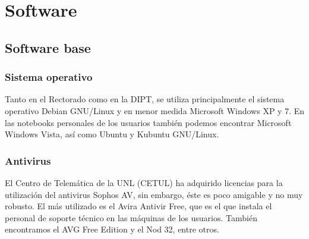 \documentclass[a4paper,11pt,oneside]{article}
\begin{document}
\section{Software}
%
\subsection{Software base}
%
\subsubsection*{Sistema operativo}
Tanto en el Rectorado como en la DIPT, se utiliza principalmente el
sistema operativo Debian GNU/Linux y en menor medida Microsoft Windows
XP y 7. En las notebooks personales de los usuarios también podemos
encontrar Microsoft Windows Vista, así como Ubuntu y Kubuntu
GNU/Linux.
%
\subsubsection*{Antivirus}
El Centro de Telemática de la UNL (CETUL) ha adquirido licencias para
la utilización del antivirus Sophos AV, sin embargo, éste es poco
amigable y no muy robusto. El más utilizado es el Avira Antivir Free,
que es el que instala el personal de soporte técnico en las máquinas
de los usuarios. También encontramos el AVG Free Edition y el Nod 32,
entre otros.
%
\end{document}

